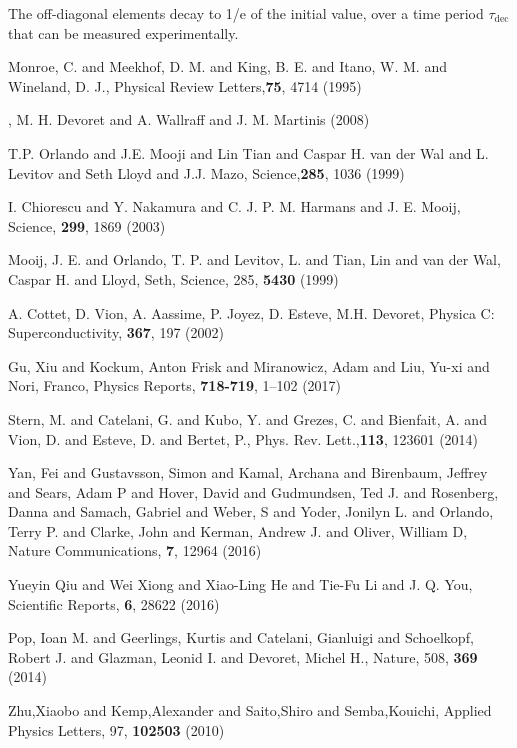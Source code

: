 \begin{thebibliography}{99}
  \noindent The off-diagonal elements decay to 1/e of the initial
  value, over a time period $\tau_{\text{dec}}$ that can be measured
  experimentally.
    
 {Monroe, C. and Meekhof, D. M. and King,
    B. E. and Itano, W. M. and Wineland, D. J.}, {Physical Review
    Letters},\textbf{75}, 4714 (1995)

, {M. H. Devoret and A. Wallraff and
    J. M. Martinis} (2008)

 {T.P. Orlando and J.E. Mooji and Lin Tian and
    Caspar H. van der Wal and L. Levitov and Seth Lloyd and
    J.J. Mazo}, {Science},\textbf{285}, {1036} (1999)

 {I. Chiorescu and Y. Nakamura and
    C. J. P. M. Harmans and J. E. Mooij}, {Science}, \textbf{299},
  1869 (2003)

 {Mooij, J. E. and Orlando, T. P. and Levitov,
    L. and Tian, Lin and van der Wal, Caspar H. and Lloyd, Seth},
  {Science}, 285, \textbf{5430} (1999)
	
 A. Cottet, D. Vion, A. Aassime, P. Joyez,
  D. Esteve, M.H. Devoret, Physica C: Superconductivity, \textbf{367},
  197 (2002)

 Gu, Xiu and Kockum, Anton Frisk and Miranowicz, Adam
  and Liu, Yu-xi and Nori, Franco, Physics Reports, \textbf{718-719},
  1--102 (2017)

 Stern, M. and Catelani, G. and Kubo, Y. and
  Grezes, C. and Bienfait, A. and Vion, D. and Esteve, D. and Bertet,
  P., Phys. Rev. Lett.,\textbf{113}, 123601 (2014)

 Yan, Fei and Gustavsson, Simon and Kamal, Archana
  and Birenbaum, Jeffrey and Sears, Adam P and Hover, David and
  Gudmundsen, Ted J. and Rosenberg, Danna and Samach, Gabriel and
  Weber, S and Yoder, Jonilyn L. and Orlando, Terry P. and Clarke,
  John and Kerman, Andrew J. and Oliver, William D, Nature
  Communications, \textbf{7}, 12964 (2016)

 Yueyin Qiu and Wei Xiong and Xiao-Ling He and Tie-Fu
  Li and J. Q. You, Scientific Reports, \textbf{6}, 28622 (2016)

 Pop, Ioan M. and Geerlings, Kurtis and Catelani,
  Gianluigi and Schoelkopf, Robert J. and Glazman, Leonid I. and
  Devoret, Michel H., Nature, 508, \textbf{369} (2014)


 Zhu,Xiaobo and Kemp,Alexander and Saito,Shiro and
  Semba,Kouichi, Applied Physics Letters, 97, \textbf{102503} (2010)



\end{thebibliography}
